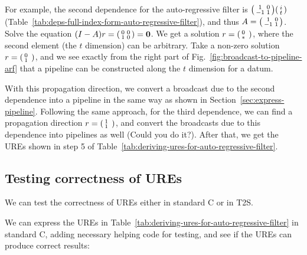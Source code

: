 For example, the second dependence for the auto-regressive filter is $\begin{psmallmatrix} 1 & 0 \\ -1 & 1\end{psmallmatrix}  \begin{psmallmatrix} i \\ t\end{psmallmatrix}$ (Table~\ref{tab:deps-full-index-form-auto-regressive-filter}), and thus $A=\begin{psmallmatrix} 1 & 0 \\ -1 & 1\end{psmallmatrix}$. Solve the equation $(I-A)r=\begin{psmallmatrix} 0 & 0 \\ 1 & 0\end{psmallmatrix}=\mathbf{0}$. We get a solution $r=\begin{psmallmatrix} 0 &\\ *\end{psmallmatrix}$, where the second element (the $t$ dimension)  can be arbitrary. Take a non-zero solution $r=\begin{psmallmatrix} 0 &\\ 1\end{psmallmatrix}$, and we see exactly from the right part of Fig.~\ref{fig:broadcast-to-pipeline-arf} that a  pipeline can be constructed along the $t$ dimension for a datum. 

With this propagation direction, we convert a broadcast due to the second dependence into a pipeline in the same way as shown in Section~\ref{sec:express-pipeline}. Following the same approach, for the third dependence, we can find a propagation direction $r=\begin{psmallmatrix} 1 &\\ 1\end{psmallmatrix}$, and convert the broadcasts due to this dependence into pipelines as well (Could you do it?). After that, we get the UREs shown in step 5 of  Table~\ref{tab:deriving-ures-for-auto-regressive-filter}.

\subsection{Testing correctness of UREs}
\label{sec:test-correctness-ures}

We can test the correctness of UREs either in standard C or in T2S.

We can express the UREs in Table~\ref{tab:deriving-ures-for-auto-regressive-filter} in standard C, adding necessary helping code for testing, and see if the UREs can produce correct results:

